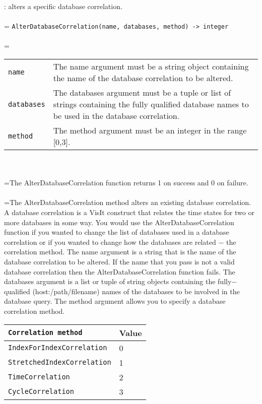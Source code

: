 \documentclass[10pt,a4paper]{report}
\begin{document}
{}
: alters a specific database correlation.\\[-3mm]

 \\ 
\hangindent=\parindent 
\verb!AlterDatabaseCorrelation(name, databases, method) -> integer!\\ [-3mm]

 \\ 
\hangindent=\parindent 
\begin{tabular}{lp{9cm}}
\verb!name! & The name argument must be a string object containing the name of the database correlation to be altered. \\
\verb!databases! & The databases argument must be a tuple or list of strings containing the fully qualified database names to be used in the database correlation. \\
\verb!method! & The method argument must be an integer in the range [0,3]. \\
\end{tabular} \\[-2mm]


 \\ 
\hangindent=\parindent The AlterDatabaseCorrelation function returns 1 on success and 0 on failure. \\[-3mm] 

 \\ 
\hangindent=\parindent The AlterDatabaseCorrelation method alters an existing database correlation. A database correlation is a VisIt construct that relates the time states for two or more databases in some way. You would use the AlterDatabaseCorrelation function if you wanted to change the list of databases used in a database correlation or if you wanted to change how the databases are related $-$ the correlation method. The name argument is a string that is the name of the database correlation to be altered. If the name that you pass is not a valid database correlation then the AlterDatabaseCorrelation function fails. The databases argument is a list or tuple of string objects containing the fully$-$qualified (host:/path/filename) names of the databases to be involved in the database query. The method argument allows you to specify a database correlation method. \\

\begin{tabular}{|l|l|}
\hline
\verb!Correlation method! & Value \\
\hline \hline
\verb!IndexForIndexCorrelation! & 0 \\
\verb!StretchedIndexCorrelation! & 1 \\
\verb!TimeCorrelation! & 2 \\
\verb!CycleCorrelation! & 3 \\
\hline
\end{tabular} \\[-2mm]
\\[-3mm] 
\end{document}
